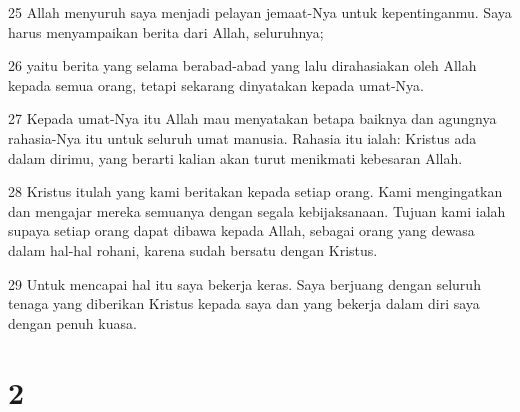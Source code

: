 \par 25 Allah menyuruh saya menjadi pelayan jemaat-Nya untuk kepentinganmu. Saya harus menyampaikan berita dari Allah, seluruhnya;
\par 26 yaitu berita yang selama berabad-abad yang lalu dirahasiakan oleh Allah kepada semua orang, tetapi sekarang dinyatakan kepada umat-Nya.
\par 27 Kepada umat-Nya itu Allah mau menyatakan betapa baiknya dan agungnya rahasia-Nya itu untuk seluruh umat manusia. Rahasia itu ialah: Kristus ada dalam dirimu, yang berarti kalian akan turut menikmati kebesaran Allah.
\par 28 Kristus itulah yang kami beritakan kepada setiap orang. Kami mengingatkan dan mengajar mereka semuanya dengan segala kebijaksanaan. Tujuan kami ialah supaya setiap orang dapat dibawa kepada Allah, sebagai orang yang dewasa dalam hal-hal rohani, karena sudah bersatu dengan Kristus.
\par 29 Untuk mencapai hal itu saya bekerja keras. Saya berjuang dengan seluruh tenaga yang diberikan Kristus kepada saya dan yang bekerja dalam diri saya dengan penuh kuasa.

\chapter{2}

